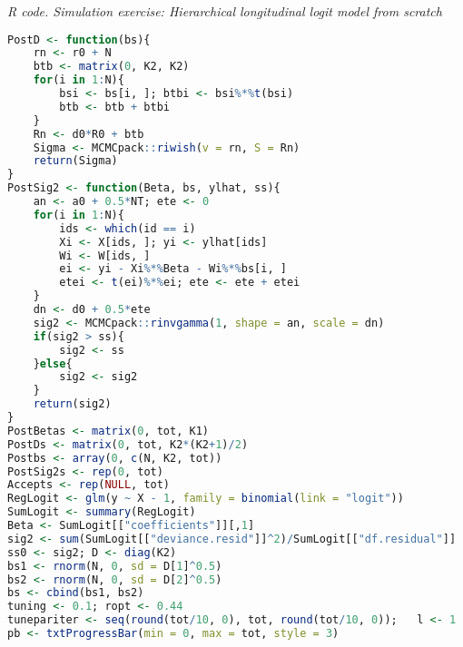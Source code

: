 \begin{enumerate}[leftmargin=*]
\begin{tcolorbox}[enhanced,width=4.67in,center upper,
	fontupper=\large\bfseries,drop shadow southwest,sharp corners]
	\textit{R code. Simulation exercise: Hierarchical longitudinal logit model from scratch}
	\begin{VF}
		\begin{lstlisting}[language=R]
PostD <- function(bs){
	rn <- r0 + N
	btb <- matrix(0, K2, K2)
	for(i in 1:N){
		bsi <- bs[i, ]; btbi <- bsi%*%t(bsi)
		btb <- btb + btbi
	}
	Rn <- d0*R0 + btb
	Sigma <- MCMCpack::riwish(v = rn, S = Rn)
	return(Sigma)
}
PostSig2 <- function(Beta, bs, ylhat, ss){
	an <- a0 + 0.5*NT; ete <- 0
	for(i in 1:N){
		ids <- which(id == i)
		Xi <- X[ids, ]; yi <- ylhat[ids]
		Wi <- W[ids, ]
		ei <- yi - Xi%*%Beta - Wi%*%bs[i, ]
		etei <- t(ei)%*%ei; ete <- ete + etei
	}
	dn <- d0 + 0.5*ete 
	sig2 <- MCMCpack::rinvgamma(1, shape = an, scale = dn)
	if(sig2 > ss){
		sig2 <- ss
	}else{
		sig2 <- sig2
	}
	return(sig2)
}
PostBetas <- matrix(0, tot, K1)
PostDs <- matrix(0, tot, K2*(K2+1)/2)
Postbs <- array(0, c(N, K2, tot))
PostSig2s <- rep(0, tot)
Accepts <- rep(NULL, tot)
RegLogit <- glm(y ~ X - 1, family = binomial(link = "logit"))
SumLogit <- summary(RegLogit)
Beta <- SumLogit[["coefficients"]][,1]
sig2 <- sum(SumLogit[["deviance.resid"]]^2)/SumLogit[["df.residual"]]
ss0 <- sig2; D <- diag(K2)
bs1 <- rnorm(N, 0, sd = D[1]^0.5)
bs2 <- rnorm(N, 0, sd = D[2]^0.5)
bs <- cbind(bs1, bs2)
tuning <- 0.1; ropt <- 0.44
tunepariter <- seq(round(tot/10, 0), tot, round(tot/10, 0));   l <- 1
pb <- txtProgressBar(min = 0, max = tot, style = 3)
\end{lstlisting}
	\end{VF}
\end{tcolorbox}



\end{enumerate}
